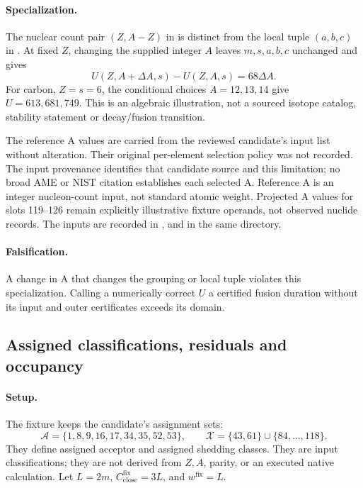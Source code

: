 \paragraph{Specialization.}
The nuclear count pair \((Z,A-Z)\) in  is distinct from the local tuple \((a,b,c)\) in . At fixed \(Z\), changing the supplied integer \(A\) leaves \(m,s,a,b,c\) unchanged and gives
\[
U(Z,A+\Delta A,s)-U(Z,A,s)=68\Delta A.
\]
For carbon, \(Z=s=6\), the conditional choices \(A=12,13,14\) give \(U=613,681,749\). This is an algebraic illustration, not a sourced isotope catalog, stability statement or decay/fusion transition.

The reference A values are carried from the reviewed candidate's input list without alteration. Their original per-element selection policy was not recorded. The input provenance identifies that candidate source and this limitation; no broad AME or NIST citation establishes each selected A. Reference A is an integer nucleon-count input, not standard atomic weight. Projected A values for slots 119--126 remain explicitly illustrative fixture operands, not observed nuclide records. The inputs are recorded in ,  and  in the same directory.

\paragraph{Falsification.}
A change in A that changes the grouping or local tuple violates this specialization. Calling a numerically correct \(U\) a certified fusion duration without its input and outer certificates exceeds its domain.


\subsection{Assigned classifications, residuals and occupancy}\label{subsec:matter1-assigned-inputs}
\paragraph{Setup.}
The fixture keeps the candidate's assignment sets:
\[
\mathcal A=\{1,8,9,16,17,34,35,52,53\},\qquad
\mathcal X=\{43,61\}\cup\{84,\ldots,118\}.
\]
They define assigned acceptor and assigned shedding classes. They are input classifications; they are not derived from \(Z,A\), parity, or an executed native calculation. Let \(L=2m\), \(C^{\mathrm{fix}}_{\mathrm{close}}=3L\), and \(w^{\mathrm{fix}}=L\).

